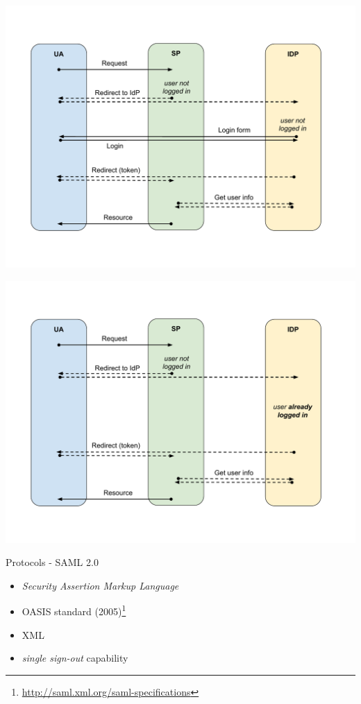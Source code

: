 \documentclass[ignorenonframetext,aspectratio=169]{beamer}
\providecommand{\tightlist}{%
  \setlength{\itemsep}{0pt}\setlength{\parskip}{0pt}}
\begin{document}
\begin{frame}[plain]
\centering
\includegraphics[height=\paperheight]{fedsso-proto-6.pdf}
\end{frame}

\begin{frame}[plain]
\centering
\includegraphics[height=\paperheight]{fedsso-proto-7.pdf}
\end{frame}

\begin{frame}{Protocols - SAML 2.0}

\begin{itemize}
\tightlist
\item \emph{Security Assertion Markup Language}
\item OASIS standard (2005)\footnote{
        \url{http://saml.xml.org/saml-specifications}}
\item XML
\item \emph{single sign-out} capability
\end{itemize}

\end{frame}
\end{document}
